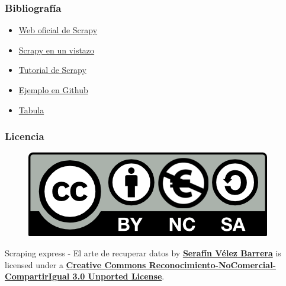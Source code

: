 \documentclass{beamer}
\begin{document}
		\begin{frame}
			\frametitle{Bibliografía}
			\begin{itemize}
				\item \href{http://scrapy.org/}{Web oficial de Scrapy}
				\item \href{http://doc.scrapy.org/en/latest/intro/overview.html}{Scrapy en un vistazo}
				\item \href{http://doc.scrapy.org/en/latest/intro/tutorial.html}{Tutorial de Scrapy}
				\item \href{https://github.com/scrapy/dirbot}{Ejemplo en Github}
				\item \href{http://tabula.nerdpower.org/}{Tabula}
			\end{itemize}
		\end{frame}

		\begin{frame}
			\frametitle{Licencia}
			\begin{figure}
				\includegraphics[keepaspectratio=true]{Licencia/00_CreativeCommons.png}
			\end{figure}
			\begin{center}
				\Large Scraping express - El arte de recuperar datos by \textbf{\href{http://seravb.wordpress.com}{Serafín Vélez Barrera}} is licensed under a
				\textbf{\href{http://creativecommons.org/licenses/by-nc-sa/3.0/deed.es_ES}{Creative Commons Reconocimiento-NoComercial-CompartirIgual 3.0 Unported License}}.
			\end{center}
		\end{frame}
\end{document}

